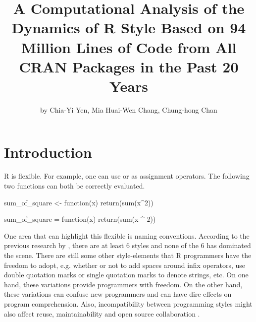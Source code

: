 \title{A Computational Analysis of the Dynamics of R Style Based on 94 Million Lines of Code from All CRAN Packages in the Past 20 Years}
\author{by Chia-Yi Yen, Mia Huai-Wen Chang, Chung-hong Chan}

\maketitle


\section{Introduction}

R is flexible. For example, one can use \code{<-} or \code{=} as assignment operators. The following two functions can both be correctly evaluated.

\begin{example}
sum_of_square <- function(x) {
    return(sum(x^2))
}
\end{example}

\begin{example}
sum_of_square = function(x) {
    return(sum(x ^ 2))
}
\end{example}

One area that can highlight this flexible is naming conventions. According to the previous research by \citet{baaaath}, there are at least 6 styles and none of the 6 has dominated the scene. There are still some other style-elements that R programmers have the freedom to adopt, e.g. whether or not to add spaces around infix operators, use double quotation marks or single quotation marks to denote strings, etc. On one hand, these variations provide programmers with freedom. On the other hand, these variations can confuse new programmers and can have dire effects on program comprehension. Also, incompatibility between programming styles might also affect reuse, maintainability \citep{elish} and open source collaboration \citep{wang}. 

